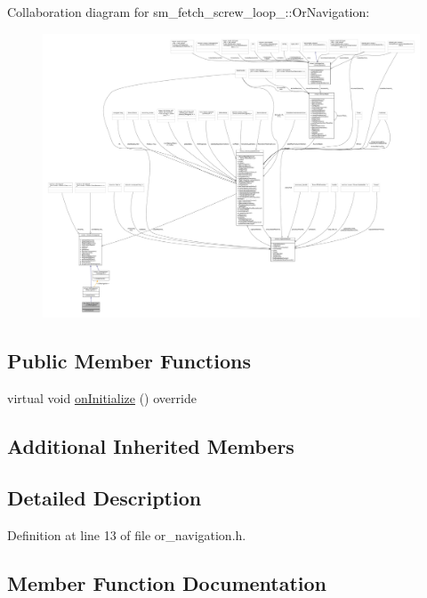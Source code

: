 Collaboration diagram for sm\+\_\+fetch\+\_\+screw\+\_\+loop\+\_\+:\+:Or\+Navigation\+:
\nopagebreak
\begin{figure}[H]
\begin{center}
\leavevmode
\includegraphics[width=350pt]{classsm__fetch__screw__loop__1_1_1OrNavigation__coll__graph}
\end{center}
\end{figure}
\subsection*{Public Member Functions}
\begin{DoxyCompactItemize}
\item 
virtual void \hyperlink{classsm__fetch__screw__loop__1_1_1OrNavigation_ad78593b6b497048ec2012a4a20f1e575}{on\+Initialize} () override
\end{DoxyCompactItemize}
\subsection*{Additional Inherited Members}


\subsection{Detailed Description}


Definition at line 13 of file or\+\_\+navigation.\+h.



\subsection{Member Function Documentation}
\mbox{\label{classsm__fetch__screw__loop__1_1_1OrNavigation_ad78593b6b497048ec2012a4a20f1e575}} 
